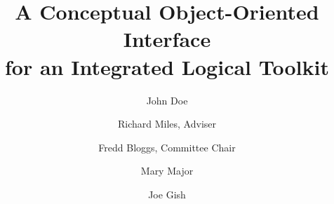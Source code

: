 \documentclass[10pt,letterpaper,openany]{book}
\author{John Doe}
\title{A Conceptual Object-Oriented Interface\\ for an Integrated Logical Toolkit}
\begin{document}
\maketitle
\copyrightpage

\frontmatter



\begin{signatures}
  \signature[Richard Miles]{Richard Miles, Adviser}
  \signature[Fred Bloggs]{Fredd Bloggs, Committee Chair}
  \signature[Mary Major]{Mary Major}
  \signature[Joe Gish]{Joe Gish}
  
\end{signatures}

\dedication{To everyone who's helped me succeed}



\tableofcontents
\listoftables
\listoffigures

\mainmatter








\backmatter

\nocite{*}


\appendix

\tableofrevisions
\end{document}
